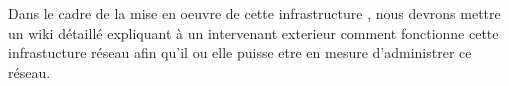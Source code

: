 \documentclass[../Livrable1.tex]{subfiles}
\begin{document}
Dans le cadre de la mise en oeuvre de cette infrastructure
, nous devrons mettre un wiki détaillé expliquant à un
 intervenant exterieur comment fonctionne cette infrastucture réseau afin qu'il ou elle puisse etre en mesure d'administrer ce réseau.
\end{document}
